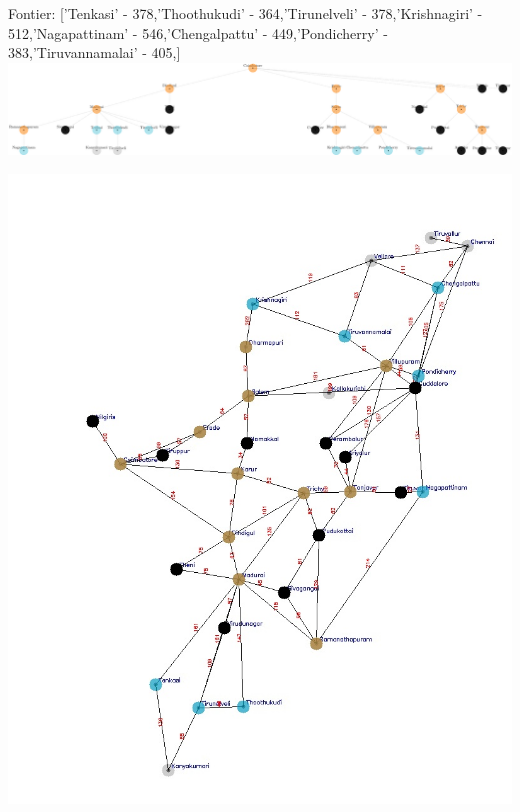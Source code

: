 \documentclass[xcolor=table]{beamer}
\begin{document}
\begin{frame}
  { \tiny Fontier: ['Tenkasi' - 378,'Thoothukudi' - 364,'Tirunelveli' - 378,'Krishnagiri' - 512,'Nagapattinam' - 546,'Chengalpattu' - 449,'Pondicherry' - 383,'Tiruvannamalai' - 405,]}
  \includegraphics[width=1\textwidth]{../UCSNodes/36-1.png}
  \begin{center}
    \includegraphics[height=0.6\textheight]{../UCSoutput/tamilUCS33.jpg}
  \end{center}
\end{frame}
\end{document}
